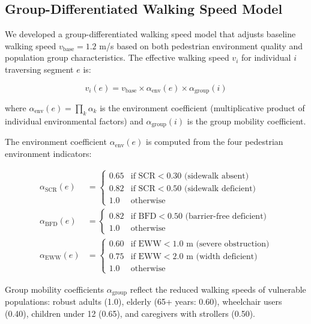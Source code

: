 \documentclass[10pt,conference,compsoc]{IEEEtran}
\begin{document}
\subsection{Group-Differentiated Walking Speed Model}

We developed a group-differentiated walking speed model that adjusts baseline walking speed $v_{\text{base}} = 1.2$ m/s based on both pedestrian environment quality and population group characteristics. The effective walking speed $v_i$ for individual $i$ traversing segment $e$ is:

\begin{equation}
v_i(e) = v_{\text{base}} \times \alpha_{\text{env}}(e) \times \alpha_{\text{group}}(i)
\label{eq:velocity_model}
\end{equation}

where $\alpha_{\text{env}}(e) = \prod_{k} \alpha_k$ is the environment coefficient (multiplicative product of individual environmental factors) and $\alpha_{\text{group}}(i)$ is the group mobility coefficient.

The environment coefficient $\alpha_{\text{env}}(e)$ is computed from the four pedestrian environment indicators:

\begin{align}
\alpha_{\text{SCR}}(e) &= 
\begin{cases}
0.65 & \text{if SCR} < 0.30 \text{ (sidewalk absent)} \\
0.82 & \text{if SCR} < 0.50 \text{ (sidewalk deficient)} \\
1.0  & \text{otherwise}
\end{cases} \label{eq:alpha_scr} \\
\alpha_{\text{BFD}}(e) &= 
\begin{cases}
0.82 & \text{if BFD} < 0.50 \text{ (barrier-free deficient)} \\
1.0  & \text{otherwise}
\end{cases} \label{eq:alpha_bfd} \\
\alpha_{\text{EWW}}(e) &= 
\begin{cases}
0.60 & \text{if EWW} < 1.0 \text{ m (severe obstruction)} \\
0.75 & \text{if EWW} < 2.0 \text{ m (width deficient)} \\
1.0  & \text{otherwise}
\end{cases} \label{eq:alpha_eww}
\end{align}

Group mobility coefficients $\alpha_{\text{group}}$ reflect the reduced walking speeds of vulnerable populations: robust adults (1.0), elderly (65+ years: 0.60), wheelchair users (0.40), children under 12 (0.65), and caregivers with strollers (0.50).
\end{document}
